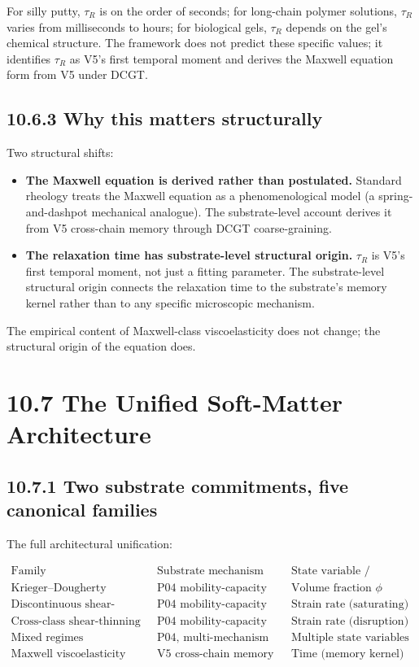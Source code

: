 \documentclass[11pt]{book}
\begin{document}
For silly putty, $\tau_R$ is on the order of seconds; for long-chain polymer solutions, $\tau_R$ varies from milliseconds to hours; for biological gels, $\tau_R$ depends on the gel's chemical structure. The framework does not predict these specific values; it identifies $\tau_R$ as V5's first temporal moment and derives the Maxwell equation form from V5 under DCGT.

\subsection{10.6.3 Why this matters structurally}

Two structural shifts:

\begin{itemize}
\item \textbf{The Maxwell equation is derived rather than postulated.} Standard rheology treats the Maxwell equation as a phenomenological model (a spring-and-dashpot mechanical analogue). The substrate-level account derives it from V5 cross-chain memory through DCGT coarse-graining.
\item \textbf{The relaxation time has substrate-level structural origin.} $\tau_R$ is V5's first temporal moment, not just a fitting parameter. The substrate-level structural origin connects the relaxation time to the substrate's memory kernel rather than to any specific microscopic mechanism.
\end{itemize}

The empirical content of Maxwell-class viscoelasticity does not change; the structural origin of the equation does.

\section{10.7 The Unified Soft-Matter Architecture}

\subsection{10.7.1 Two substrate commitments, five canonical families}

The full architectural unification:

\[
\begin{array}{l|l|l}
\text{Family} & \text{Substrate mechanism} & \text{State variable / mechanism} \\
\hline
\text{Krieger–Dougherty} & \text{P04 mobility-capacity bound} & \text{Volume fraction } \phi \\
\text{Discontinuous shear-thickening} & \text{P04 mobility-capacity bound} & \text{Strain rate (saturating)} \\
\text{Cross-class shear-thinning} & \text{P04 mobility-capacity bound} & \text{Strain rate (disruption)} \\
\text{Mixed regimes} & \text{P04, multi-mechanism} & \text{Multiple state variables} \\
\text{Maxwell viscoelasticity} & \text{V5 cross-chain memory} & \text{Time (memory kernel)} \\
\end{array}
\]
\end{document}
